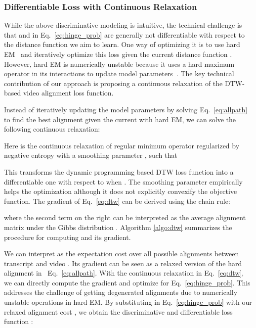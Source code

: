 \documentclass[10pt,twocolumn,letterpaper]{article}
\newcommand{\eqnref}[1]{{Eq.\ \eqref{eq:#1}}}
\begin{document}
\subsubsection{Differentiable Loss with Continuous Relaxation}
\label{sec:method_d3tw}
While the above discriminative modeling is intuitive, the technical challenge is that  and  in \eqnref{hinge_prob} are generally not differentiable with respect to the distance function  we aim to learn. One way of optimizing it is to use hard EM~\cite{richard2017weakly,richard2018neuralnetwork} and iteratively optimize this loss given the current distance function . However, hard EM is numerically unstable because it uses a hard maximum operator in its interactions to update model parameters~\cite{mensch2018differentiable}. The key technical contribution of our approach is proposing a continuous relaxation of the DTW-based video alignment loss function. 

Instead of iteratively updating the model parameters by solving \eqnref{allpath} to find the best alignment given the current  with hard EM, we can solve the following continuous relaxation:

Here  is the continuous relaxation of regular minimum operator regularized by negative entropy  with a smoothing parameter , such that

This transforms the dynamic programming based DTW loss function into a differentiable one with respect to  when . The smoothing parameter  empirically helps the optimization although it does not explicitly convexify the objective function.
The gradient of Eq.~\eqref{eq:dtw} can be derived using the chain rule:

where the second term on the right can be interpreted as the average alignment matrix under the Gibbs distribution . Algorithm \ref{algo:dtw} summarizes the procedure for computing  and its gradient. 

We can interpret  as the expectation cost over all possible alignments between transcript  and video . Its gradient  can be seen as a relaxed version of the hard alignment  in ~\eqnref{allpath}. With the continuous relaxation in \eqnref{dtw}, we can directly compute the gradient and optimize for \eqnref{hinge_prob}. This addresses the challenge of getting degenerated alignments due to numerically unstable operations in hard EM. By substituting  in \eqnref{hinge_prob} with our relaxed alignment cost , we obtain the discriminative and differentiable loss function :
\end{document}
